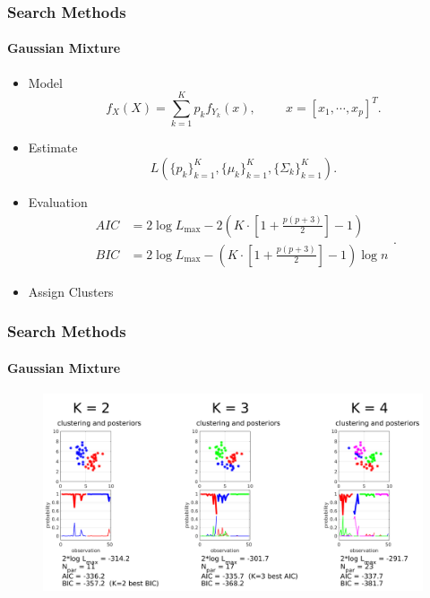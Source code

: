\documentclass[aspectratio=169,10pt,t]{beamer}
\begin{document}
\begin{frame}[t]
	\frametitle{Search Methods}
	\framesubtitle{Gaussian Mixture}


	\begin{itemize}
		\item Model\\
			\[
				f _{X} \left( X \right)  =
				\sum^{K}_{k=1} 
				p_k f _{Y_k}  \left( x \right) ,
				\hspace{1cm}
				x = \left[ x_1, \cdots, x_p \right] ^{T}
			.\] 
			\pause
		\item Estimate 
			\[
				L  \left( \{ p_k \} ^{K}_{k=1},
					\{ \mu_k \}^{K}_{k=1},
					\{ \Sigma_{k} \}^{K}_{k=1}
				\right) 
			.\] 
			\pause
		\item Evaluation
			\[
				\begin{aligned}
					AIC &= 2 \log L _{\max} - 2
					\left( K \cdot  \left[ 1 + \frac{p \left( p+3 \right) }{2}  \right] -1  \right) \\
					BIC &= 2 \log L _{\max} -
					\left(  K \cdot  \left[ 1 + \frac{p \left( p+3 \right) }{2}  \right] -1  \right) 
					\log n
				\end{aligned}
			.\] 
    \item Assign Clusters
	\end{itemize}


\end{frame}

\begin{frame}[t]
	\frametitle{Search Methods}
	\framesubtitle{Gaussian Mixture}
    
	\begin{figure}[h]
		\centering
		\includegraphics[width=0.8\linewidth]{images/gmm.png}
	\end{figure}

\end{frame}
\end{document}
